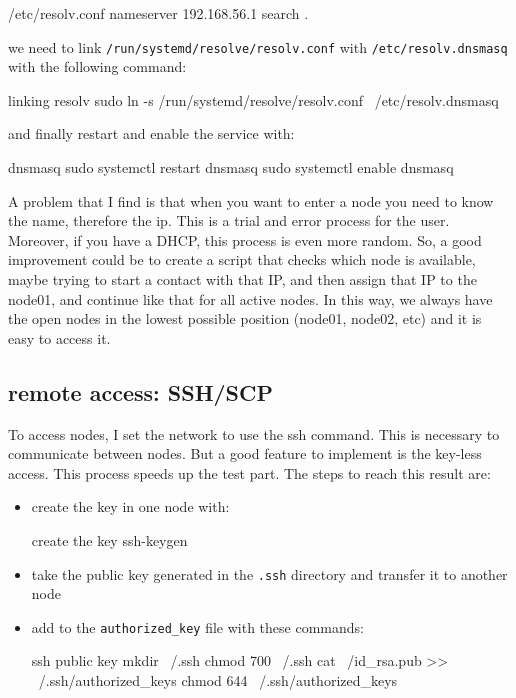\begin{codice}[]{/etc/resolv.conf}
    nameserver 192.168.56.1
    search .
\end{codice}

we need to link \texttt{/run/systemd/resolve/resolv.conf} with \texttt{/etc/resolv.dnsmasq} with the following command:

\begin{codice}[style=bashstyle]{linking resolv}
    sudo ln -s /run/systemd/resolve/resolv.conf \
    /etc/resolv.dnsmasq
\end{codice}

and finally restart and enable the service with:

\begin{codice}[style=bashstyle]{dnsmasq}
    sudo systemctl restart dnsmasq
    sudo systemctl enable dnsmasq
\end{codice}

A problem that I find is that when you want to enter a node you need to know the name, therefore the ip. This is a trial and error process for the user. Moreover, if you have a DHCP, this process is even more random. So, a good improvement could be to create a script that checks which node is available, maybe trying to start a contact with that IP, and then assign that IP to the node01, and continue like that for all active nodes. In this way, we always have the open nodes in the lowest possible position (node01, node02, etc) and it is easy to access it.

\subsection{remote access: SSH/SCP}
To access nodes, I set the network to use the ssh command. This is necessary to communicate between nodes. But a good feature to implement is the key-less access. This process speeds up the test part. The steps to reach this result are:

\begin{itemize}
    \item create the key in one node with:
          \begin{codice}[style=bashstyle]{create the key}
              ssh-keygen
          \end{codice}
    \item take the public key generated in the \texttt{.ssh} directory and transfer it to another node
    \item add to the \texttt{authorized\_key} file with these commands:
          \begin{codice}[style=bashstyle]{ssh public key}
              mkdir ~/.ssh
              chmod 700 ~/.ssh
              cat ~/id_rsa.pub >> ~/.ssh/authorized_keys
              chmod 644 ~/.ssh/authorized_keys
          \end{codice}
\end{itemize}

